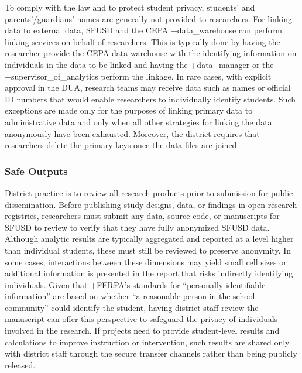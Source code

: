 \documentclass[
]{WileySix}
\begin{document}
To comply with the law and to protect student privacy, students' and parents'/guardians' names are generally not provided to researchers. For linking data to external data, SFUSD and the CEPA +data\_warehouse\textbar{} can perform linking services on behalf of researchers. This is typically done by having the researcher provide the CEPA data warehouse with the identifying information on individuals in the data to be linked and having the +data\_manager\textbar{} or the +supervisor\_of\_analytics\textbar{} perform the linkage. In rare cases, with explicit approval in the DUA, research teams may receive data such as names or official ID numbers that would enable researchers to individually identify students. Such exceptions are made only for the purposes of linking primary data to administrative data and only when all other strategies for linking the data anonymously have been exhausted. Moreover, the district requires that researchers delete the primary keys once the data files are joined.

\hypertarget{safe-outputs-5}{%
\subsubsection{Safe Outputs}\label{safe-outputs-5}}

District practice is to review all research products prior to submission for public dissemination. Before publishing study designs, data, or findings in open research registries, researchers must submit any data, source code, or manuscripts for SFUSD to review to verify that they have fully anonymized SFUSD data. Although analytic results are typically aggregated and reported at a level higher than individual students, these must still be reviewed to preserve anonymity. In some cases, interactions between these dimensions may yield small cell sizes or additional information is presented in the report that risks indirectly identifying individuals. Given that +FERPA\textbar's standards for ``personally identifiable information'' are based on whether ``a reasonable person in the school community'' could identify the student, having district staff review the manuscript can offer this perspective to safeguard the privacy of individuals involved in the research. If projects need to provide student-level results and calculations to improve instruction or intervention, such results are shared only with district staff through the secure transfer channels rather than being publicly released.
\end{document}
